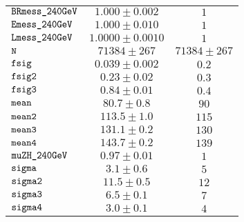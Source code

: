 \begin{tabular}{lcc}
$\verb+BRmess_240GeV+ $ & $  1.000\pm 0.002$ & $ 1$\\
$\verb+Emess_240GeV+ $ & $  1.000\pm 0.010$ & $ 1$\\
$\verb+Lmess_240GeV+ $ & $  1.0000\pm 0.0010$ & $ 1$\\
$\verb+N+ $ & $  71384\pm 267$ & $ 71384\pm 267$\\
$\verb+fsig+ $ & $  0.039\pm 0.002$ & $ 0.2$\\
$\verb+fsig2+ $ & $  0.23\pm 0.02$ & $ 0.3$\\
$\verb+fsig3+ $ & $  0.84\pm 0.01$ & $ 0.4$\\
$\verb+mean+ $ & $  80.7\pm 0.8$ & $ 90$\\
$\verb+mean2+ $ & $  113.5\pm 1.0$ & $ 115$\\
$\verb+mean3+ $ & $  131.1\pm 0.2$ & $ 130$\\
$\verb+mean4+ $ & $  143.7\pm 0.2$ & $ 139$\\
$\verb+muZH_240GeV+ $ & $  0.97\pm 0.01$ & $ 1$\\
$\verb+sigma+ $ & $  3.1\pm 0.6$ & $ 5$\\
$\verb+sigma2+ $ & $  11.5\pm 0.5$ & $ 12$\\
$\verb+sigma3+ $ & $  6.5\pm 0.1$ & $ 7$\\
$\verb+sigma4+ $ & $  3.0\pm 0.1$ & $ 4$\\
\end{tabular}

